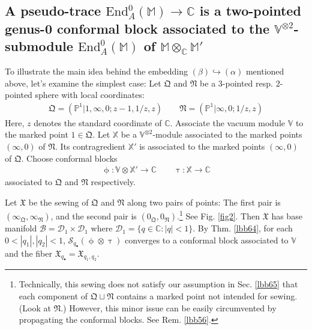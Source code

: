 \documentclass[11pt,b5paper,notitlepage]{article}
\theoremstyle{definition}
\theoremstyle{plain}
\newcommand{\fk}{\mathfrak}
\newcommand{\End}{\mathrm{End}} %
\newcommand{\blt}{\bullet}
\newcommand{\Vbb}{\mathbb V}
\newcommand{\Xbb}{\mathbb X}
\newcommand{\Mbb}{\mathbb M}
\newcommand{\Cbb}{\mathbb C}
\newcommand{\Pbb}{\mathbb P}
\newcommand{\<}{\left\langle}
\renewcommand{\>}{\right\rangle}
\newcommand{\MB}{\mathcal{B}}
\newcommand{\fx}{\mathfrak{X}}
\newcommand{\MD}{\mathcal{D}}
\newcommand{\MS}{\mathcal{S}}
\newcommand{\fq}{{\mathfrak Q}}
\newcommand{\fn}{\mathfrak{N}}
\numberwithin{equation}{section}
\begin{document}
\subsection{A pseudo-trace $\End^0_A(\Mbb)\rightarrow\Cbb$ is a two-pointed genus-0 conformal block associated to the $\Vbb^{\otimes 2}$-submodule $\End^0_A(\Mbb)$ of $\Mbb\otimes_\Cbb\Mbb'$}



To illustrate the main idea behind the embedding $(\beta)\hookrightarrow(\alpha)$ mentioned above, let's examine the simplest case: Let $\fk Q$ and $\fn$ be a $3$-pointed resp. $2$-pointed sphere with local coordinates:
\begin{align*}
\fk Q=(\Pbb^1|1, \infty,0;z-1,1/z,z)\qquad \fk N=(\Pbb^1|\infty,0;1/z,z)
\end{align*}   
Here, $z$ denotes the standard coordinate of $\Cbb$. Associate the vacuum module $\Vbb$ to the marked point $1\in\fk Q$. Let $\Xbb$ be a $\Vbb^{\otimes 2}$-module associated to the marked points $(\infty,0)$ of $\fn$. Its contragredient $\Xbb'$ is associated to the marked points $(\infty,0)$ of $\fk Q$. Choose conformal blocks
\begin{align*}
\upphi:\Vbb\otimes\Xbb'\rightarrow\Cbb\qquad \uptau:\Xbb\rightarrow \Cbb
\end{align*}
associated to $\fk Q$ and $\fn$ respectively.


Let $\fx$ be the sewing of $\fq$ and $\fn$ along two pairs of points: The first pair is $(\infty_\fq,\infty_\fn)$, and the second pair is $(0_\fq,0_\fn)$.\footnote{Technically, this sewing does not satisfy our assumption in Sec. \ref{lbb65} that each component of $\fq\sqcup\fn$ contains a marked point not intended for sewing. (Look at $\fn$.) However, this minor issue can be easily circumvented by propagating the conformal blocks. See Rem. \ref{lbb56}.} See Fig. \ref{fig2}. Then $\fx$ has base manifold $\MB=\MD_1\times\MD_1$ where $\MD_1=\{q\in\Cbb:|q|<1\}$. By Thm. \ref{lbb64}, for each $0<|q_1|,|q_2|<1$,  $\MS_{q_\blt}(\upphi\otimes\uptau)$ converges to a conformal block associated to $\Vbb$ and the fiber $\fx_{q_\blt}=\fx_{q_1,q_2}$. 
\end{document}
